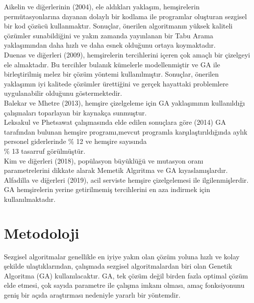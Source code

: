 \documentclass[12pt, a4paper]{article}
\begin{document}
\begin{flushleft}
	
	
	
	\cite{aickelin2004indirect} 
	Aikelin ve diğerlerinin (2004), ele aldıkları yaklaşım, hemşirelerin permütasyonlarına dayanan dolaylı bir kodlama ile programlar oluşturan sezgisel bir kod çözücü kullanmaktır. Sonuçlar, önerilen algoritmanın yüksek	kaliteli çözümler sunabildiğini ve yakın zamanda yayınlanan bir Tabu Arama yaklaşımından daha hızlı ve daha esnek olduğunu ortaya koymaktadır.\\[10pt]
	
	\cite{duenas2009genetic} 
	Duenas ve diğerleri (2009), hemşirelerin tercihlerini içeren çok amaçlı bir 
	çizelgeyi ele almaktadır. Bu tercihler bulanık kümelerle modellenmiştir ve GA ile birleştirilmiş melez bir çözüm yöntemi kullanılmıştır. Sonuçlar, önerilen yaklaşımın iyi kalitede çözümler ürettiğini ve gerçek hayattaki problemlere uygulanabilir olduğunu göstermektedir.\\[10pt] 
	
	
	
	\cite{balekar2013survey} 
	Balekar ve Mhetre (2013), hemşire çizelgeleme	için GA yaklaşımının kullanıldığı çalışmaları toparlayan bir kaynakça sunmuştur.\\[10pt]
	
	\cite{leksakul2014nurse} 
	Leksakul ve Phetsawat çalışmasında elde edilen sonuçlara göre (2014) GA tarafından bulunan hemşire programı,mevcut programla karşılaştırıldığında aylık personel giderlerinde \% 12 ve hemşire sayısında \\ \% 13 tasarruf  görülmüştür.\\[10pt]
	
	
	\cite{kim2018genetic}
	Kim ve diğerleri (2018), popülasyon 
	büyüklüğü ve mutasyon oranı parametrelerini dikkate alarak Memetik Algıritma ve GA 
	kıyaslamışlardır.\\[10pt]
	
	\cite{alfadilla2019optimization} 
	Alfadilla ve diğerleri (2019), acil serviste hemşire çizelgelemesi ile 
	ilgilenmişlerdir. GA hemşirelerin yerine getirilmemiş tercihlerini en aza indirmek için 
	kullanılmaktadır.\\[10pt] 
	

	

	\section{Metodoloji}
	Sezgisel algoritmalar 
	genellikle en iyiye yakın olan çözüm yoluna hızlı ve kolay şekilde ulaştıklarından, çalışmada sezgisel algoritmalardan biri olan Genetik Algoritma (GA) kullanılacaktır. GA, tek çözüm değil birden fazla optimal çözüm elde etmesi, çok sayıda parametre ile çalışma imkanı olması, amaç fonksiyonunu geniş bir açıda araştırması nedeniyle yararlı bir yöntemdir. 
	\\[5pt]
	

\end{flushleft}
\end{document}
